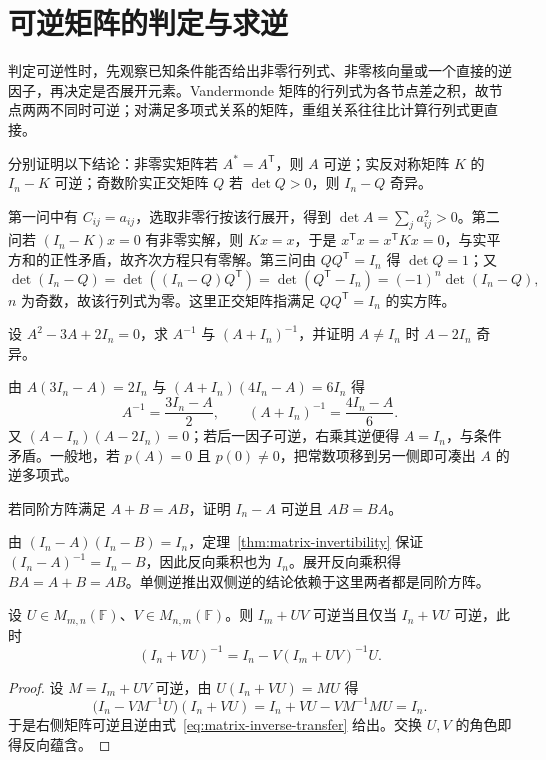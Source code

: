 \section{可逆矩阵的判定与求逆}
\label{sec:matrix-inverse-methods}

判定可逆性时，先观察已知条件能否给出非零行列式、非零核向量或一个直接的逆因子，再决定是否展开元素。Vandermonde 矩阵的行列式为各节点差之积，故节点两两不同时可逆；对满足多项式关系的矩阵，重组关系往往比计算行列式更直接。

\begin{example}
\label{ex:matrix-invertibility-tests}
分别证明以下结论：非零实矩阵若 $A^*=A^{\mathsf T}$，则 $A$ 可逆；实反对称矩阵 $K$ 的 $I_n-K$ 可逆；奇数阶实正交矩阵 $Q$ 若 $\det Q>0$，则 $I_n-Q$ 奇异。
\end{example}
\begin{solve}
第一问中有 $C_{ij}=a_{ij}$，选取非零行按该行展开，得到 $\det A=\sum_j a_{ij}^2>0$。第二问若 $(I_n-K)x=0$ 有非零实解，则 $Kx=x$，于是 $x^{\mathsf T}x=x^{\mathsf T}Kx=0$，与实平方和的正性矛盾，故齐次方程只有零解。第三问由 $QQ^{\mathsf T}=I_n$ 得 $\det Q=1$；又
\[
 \det(I_n-Q)=\det((I_n-Q)Q^{\mathsf T})
 =\det(Q^{\mathsf T}-I_n)=(-1)^n\det(I_n-Q),
\]
$n$ 为奇数，故该行列式为零。这里正交矩阵指满足 $QQ^{\mathsf T}=I_n$ 的实方阵。
\end{solve}

\begin{example}
\label{ex:matrix-polynomial-inverse}
设 $A^2-3A+2I_n=0$，求 $A^{-1}$ 与 $(A+I_n)^{-1}$，并证明 $A\ne I_n$ 时 $A-2I_n$ 奇异。
\end{example}
\begin{solve}
由 $A(3I_n-A)=2I_n$ 与 $(A+I_n)(4I_n-A)=6I_n$ 得
\[
 A^{-1}=\frac{3I_n-A}{2},\qquad
 (A+I_n)^{-1}=\frac{4I_n-A}{6}.
\]
又 $(A-I_n)(A-2I_n)=0$；若后一因子可逆，右乘其逆便得 $A=I_n$，与条件矛盾。一般地，若 $p(A)=0$ 且 $p(0)\ne0$，把常数项移到另一侧即可凑出 $A$ 的逆多项式。
\end{solve}

\begin{example}
若同阶方阵满足 $A+B=AB$，证明 $I_n-A$ 可逆且 $AB=BA$。
\end{example}
\begin{solve}
由 $(I_n-A)(I_n-B)=I_n$，定理~\ref{thm:matrix-invertibility} 保证 $(I_n-A)^{-1}=I_n-B$，因此反向乘积也为 $I_n$。展开反向乘积得 $BA=A+B=AB$。单侧逆推出双侧逆的结论依赖于这里两者都是同阶方阵。
\end{solve}

\begin{theorem}
\label{thm:matrix-inverse-transfer}
设 $U\in M_{m,n}(\mathbb F)$、$V\in M_{n,m}(\mathbb F)$。则 $I_m+UV$ 可逆当且仅当 $I_n+VU$ 可逆，此时
\begin{equation}
 (I_n+VU)^{-1}=I_n-V(I_m+UV)^{-1}U.
 \label{eq:matrix-inverse-transfer}
\end{equation}
\end{theorem}
\begin{proof}
设 $M=I_m+UV$ 可逆，由 $U(I_n+VU)=MU$ 得
\[
 \bigl(I_n-VM^{-1}U\bigr)(I_n+VU)
 =I_n+VU-VM^{-1}MU=I_n.
\]
于是右侧矩阵可逆且逆由式~\eqref{eq:matrix-inverse-transfer} 给出。交换 $U,V$ 的角色即得反向蕴含。
\end{proof}

